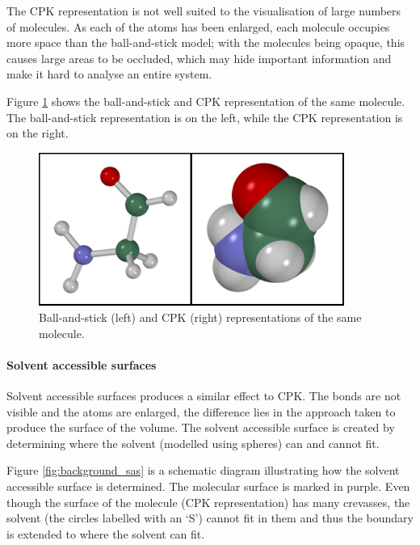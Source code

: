 The CPK representation is not well suited to the visualisation of large numbers
of molecules. As each of the atoms has been enlarged, each molecule occupies
more space than the ball-and-stick model; with the molecules being opaque, this
causes large areas to be occluded, which may hide important information and
make it hard to analyse an entire system.

Figure \ref{fig:background_ball_cpk} shows the ball-and-stick and CPK
representation of the same molecule. The ball-and-stick representation is on
the left, while the CPK representation is on the right.

\begin{figure}
  \begin{center}
    \includegraphics[width=100mm]{ball_cpk}
  \end{center}
  \caption{Ball-and-stick (left) and CPK (right) representations of the same
  molecule.}
  \label{fig:background_ball_cpk}
\end{figure}


\paragraph{Solvent accessible surfaces}

Solvent accessible surfaces \citep{connolly83} produces a similar effect to
CPK. The bonds are not visible and the atoms are enlarged, the difference lies
in the approach taken to produce the surface of the volume. The solvent
accessible surface is created by determining where the solvent (modelled using
spheres) can and cannot fit.

Figure \ref{fig:background_sas} is a schematic diagram illustrating how the
solvent accessible surface is determined. The molecular surface is marked in
purple. Even though the surface of the molecule (CPK representation) has many
crevasses, the solvent (the circles labelled with an `S') cannot fit in them and
thus the boundary is extended to where the solvent can fit.

